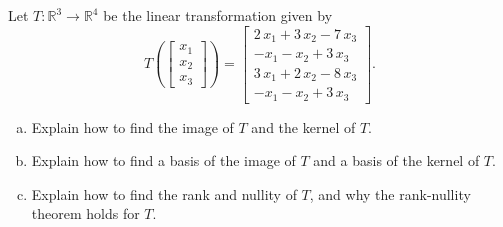 
\begin{exerciseStatement}
 Let \(T:\mathbb{R}^ 3  \to \mathbb{R}^ 4 \) be the linear transformation given by \[T\left(  \left[\begin{array}{c}
x_{1} \\
x_{2} \\
x_{3}
\end{array}\right]  \right) =  \left[\begin{array}{c}
2 \, x_{1} + 3 \, x_{2} - 7 \, x_{3} \\
-x_{1} - x_{2} + 3 \, x_{3} \\
3 \, x_{1} + 2 \, x_{2} - 8 \, x_{3} \\
-x_{1} - x_{2} + 3 \, x_{3}
\end{array}\right] .\]
\begin{enumerate}[(a)]
\item Explain how to find the image of \(T\) and the kernel of \(T\).
\item Explain how to find a basis of the image of \(T\) and a basis of the kernel of \(T\).
\item Explain how to find the rank and nullity of \(T\), and why the rank-nullity theorem holds for \(T\).
\end{enumerate}
    
\end{exerciseStatement}
    
